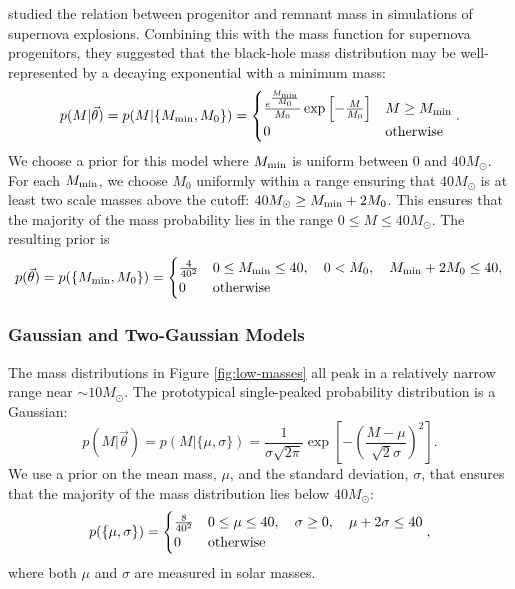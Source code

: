 \documentclass[preprint]{aastex}
\newcommand{\Msun}{M_\odot}
\newcommand{\Mmin}{M_{\textnormal{min}}}
\newcommand{\vtheta}{\vec{\theta}}
\begin{document}
\citet{Fryer2001} studied the relation between progenitor and remnant
mass in simulations of supernova explosions.  Combining this with the
mass function for supernova progenitors, they suggested that the
black-hole mass distribution may be well-represented by a decaying
exponential with a minimum mass: 
\begin{equation}
  \label{eq:exp-def}
  p(M|\vtheta) = p(M|\{\Mmin, M_0\}) = 
  \begin{cases}
    \frac{e^{\frac{\Mmin}{M_0}}}{M_0} \exp \left[ - \frac{M}{M_0}
    \right] & M \geq \Mmin \\
    0 & \textnormal{otherwise}
  \end{cases}.
\end{equation}
We choose a prior for this model where $\Mmin$ is uniform between 0
and $40 \Msun$.  For each $\Mmin$, we choose $M_0$ uniformly within a
range ensuring that $40\Msun$ is at least two scale masses above the
cutoff: $40\Msun \geq \Mmin + 2 M_0$.  This ensures that the majority
of the mass probability lies in the range $0 \leq M \leq 40\Msun$.
The resulting prior is
\begin{equation}
  p(\vtheta) = p(\{\Mmin, M_0\}) = 
  \begin{cases}
    \frac{4}{40^2} & 0 \leq \Mmin \leq 40, \quad 0 < M_0, \quad \Mmin
    + 2 M_0 \leq 40, \\
    0 & \textnormal{otherwise}
  \end{cases}
\end{equation}

\subsubsection{Gaussian and Two-Gaussian Models}
\label{sec:gaussian}

The mass distributions in Figure \ref{fig:low-masses} all peak in a
relatively narrow range near $\sim 10 \Msun$.  The prototypical
single-peaked probability distribution is a Gaussian:
\begin{equation}
  \label{eq:gaussian-def}
  p(M|\vtheta) = p(M|\{\mu, \sigma\}) = \frac{1}{\sigma \sqrt{2\pi}}
  \exp\left[ - \left(\frac{M - \mu}{\sqrt{2} \sigma} \right)^2 \right].
\end{equation}
We use a prior on the mean mass, $\mu$, and the standard deviation,
$\sigma$, that ensures that the majority of the mass distribution lies
below $40 \Msun$:
\begin{equation}
  \label{eq:gaussian-prior-def}
  p(\{\mu,\sigma\}) = 
  \begin{cases}
    \frac{8}{40^2} & 0 \leq \mu \leq 40, \quad \sigma \geq 0, \quad
    \mu + 2\sigma \leq 40 \\
    0 & \textnormal{otherwise}
  \end{cases},
\end{equation}
where both $\mu$ and $\sigma$ are measured in solar masses.  
\end{document}
